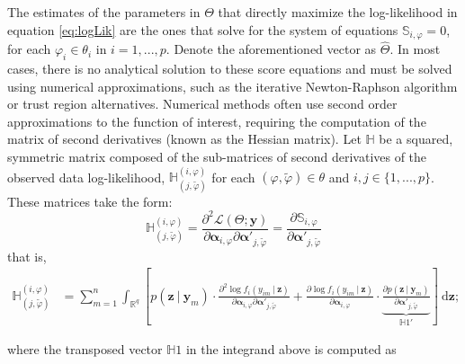 \documentclass[11pt, a4paper]{article}
\newcommand{\R}{{\ensuremath{\mathbb{R}}}}
\newcommand{\cond}{\!~|~\!}
\begin{document}
The estimates of the parameters in $\Theta$ that directly maximize the log-likelihood in equation \eqref{eq:logLik} are the ones that solve for the system of equations $\mathbb{S}_{i,\varphi} = 0$, for each $\varphi_i \in \theta_i$ in $i = 1,...,p$. Denote the aforementioned vector as $\hat{\Theta}$. In most cases, there is no analytical solution to these score equations and must be solved using numerical approximations, such as the iterative Newton-Raphson algorithm or trust region alternatives. Numerical methods often use second order approximations to the function of interest, requiring the computation of the matrix of second derivatives (known as the Hessian matrix). Let $\mathbb{H}$ be a squared, symmetric matrix composed of the sub-matrices of second derivatives of the observed data log-likelihood, $\mathbb{H}_{(j,\tilde{\varphi})}^{(i,\varphi)}$ for each $(\varphi, \tilde{\varphi}) \in \theta$ and $i,j \in \{1,...,p\}$. These matrices take the form:
\begin{equation*}
\mathbb{H}_{(j,\tilde{\varphi})}^{(i,\varphi)} =  \frac{\partial^2 \mathcal{L}(\Theta; \mathbf{y})}{\partial \bm{\alpha}_{i,\varphi} \partial \bm{\alpha}'_{j,\tilde{\varphi}}} = \frac{\partial \mathbb{S}_{i,\varphi}}{\partial \bm{\alpha}'_{j,\tilde{\varphi}}}
\end{equation*}
that is,
\begin{align*}
\mathbb{H}_{(j,\tilde{\varphi})}^{(i,\varphi)} & = \sum\limits_{m=1}^{n} \int_{\R^q} \left[p(\mathbf{z} \cond \mathbf{y}_m) \cdot \frac{\partial^2 \log f_i(y_{im} \cond \mathbf{z})}{\partial \bm{\alpha}_{i,\varphi} \partial \bm{\alpha}'_{j,\tilde{\varphi}}} + \frac{\partial \log f_i(y_{im} \cond \mathbf{z})}{\partial \bm{\alpha}_{i,\varphi}} \cdot \underbrace{\frac{\partial p(\mathbf{z} \cond \mathbf{y}_m)}{\partial \bm{\alpha}'_{j,\tilde{\varphi}}}}_{\mathbb{H}1'} \right] ~ \text{d}\mathbf{z}; \label{eq:A2Hessian} \tag{A2}
\end{align*}

where the transposed vector $\mathbb{H}1$ in the integrand above is computed as
\end{document}
